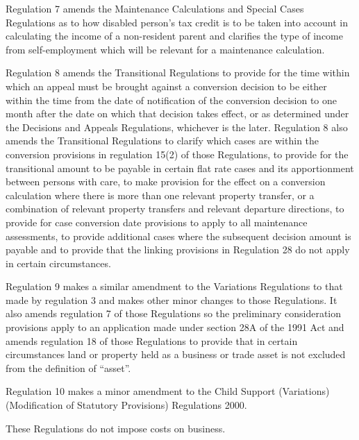 \documentclass[12pt,a4paper]{article}
\begin{document}
Regulation 7 amends the Maintenance Calculations and Special Cases Regulations as to how disabled person’s tax credit is to be taken into account in calculating the income of a non-resident parent and clarifies the type of income from self-employment which will be relevant for a maintenance calculation.

Regulation 8 amends the Transitional Regulations to provide for the time within which an appeal must be brought against a conversion decision to be either within the time from the date of notification of the conversion decision to one month after the date on which that decision takes effect, or as determined under the Decisions and Appeals Regulations, whichever is the later. Regulation 8 also amends the Transitional Regulations to clarify which cases are within the conversion provisions in regulation 15(2) of those Regulations, to provide for the transitional amount to be payable in certain flat rate cases and its apportionment between persons with care, to make provision for the effect on a conversion calculation where there is more than one relevant property transfer, or a combination of relevant property transfers and relevant departure directions, to provide for case conversion date provisions to apply to all maintenance assessments, to provide additional cases where the subsequent decision amount is payable and to provide that the linking provisions in Regulation 28 do not apply in certain circumstances.

Regulation 9 makes a similar amendment to the Variations Regulations to that made by regulation 3 and makes other minor changes to those Regulations. It also amends regulation 7 of those Regulations so the preliminary consideration provisions apply to an application made under section 28A of the 1991 Act and amends regulation 18 of those Regulations to provide that in certain circumstances land or property held as a business or trade asset is not excluded from the definition of “asset”.

Regulation 10 makes a minor amendment to the Child Support (Variations) (Modification of Statutory Provisions) Regulations 2000.

These Regulations do not impose costs on business. 
\end{document}
